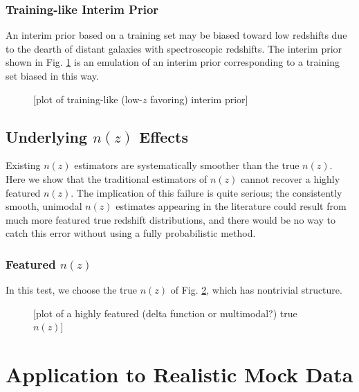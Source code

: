 \documentclass[iop]{emulateapj}
\begin{document}
\subsubsection{Training-like Interim Prior}
\label{sec:trainintpr}

An interim prior based on a training set may be biased toward low redshifts due to the dearth of distant galaxies with spectroscopic redshifts.  The interim prior shown in Fig. \ref{fig:trainintpr} is an emulation of an interim prior corresponding to a training set biased in this way.

\begin{figure}
	\begin{center}
		\caption{[plot of training-like (low-$z$ favoring) interim prior]}
		\label{fig:trainintpr}
	\end{center}
\end{figure}

\subsection{Underlying $n(z)$ Effects}
\label{sec:truth}

Existing $n(z)$ estimators are systematically smoother than the true $n(z)$.  Here we show that the traditional estimators of $n(z)$ cannot recover a highly featured $n(z)$.  The implication of this failure is quite serious; the consistently smooth, unimodal $n(z)$ estimates appearing in the literature could result from much more featured true redshift distributions, and there would be no way to catch this error without using a fully probabilistic method.

\subsubsection{Featured $n(z)$}
\label{sec:featured}

In this test, we choose the true $n(z)$ of Fig. \ref{fig:featured}, which has nontrivial structure.

\begin{figure}
	\begin{center}
		\caption{[plot of a highly featured (delta function or multimodal?) true $n(z)$]}
		\label{fig:featured}
	\end{center}
\end{figure}

\section{Application to Realistic Mock Data}
\label{sec:application}
\end{document}
